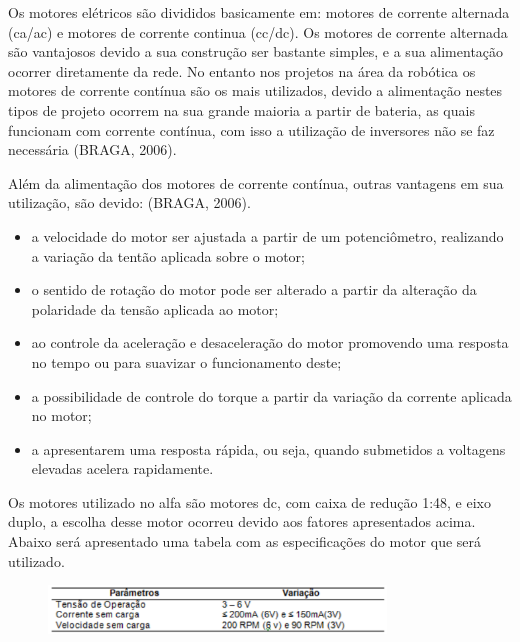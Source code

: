 Os motores elétricos são divididos basicamente em: motores de corrente alternada (ca/ac) e motores de corrente continua (cc/dc). Os motores de corrente alternada são vantajosos devido a sua construção ser bastante simples, e a sua alimentação ocorrer diretamente da rede. No entanto nos projetos na área da robótica os motores de corrente contínua são os mais utilizados, devido a alimentação nestes tipos de projeto ocorrem na sua grande maioria a partir de bateria, as quais funcionam com corrente contínua, com isso a utilização de inversores não se faz necessária (BRAGA, 2006).


Além da alimentação dos motores de corrente contínua, outras vantagens em sua utilização, são devido: (BRAGA, 2006).
\begin{itemize}
	\item a velocidade do motor ser ajustada a partir de um potenciômetro, realizando a variação da tentão aplicada sobre o motor;
	\item o sentido de rotação do motor pode ser alterado a partir da alteração da polaridade da tensão aplicada ao motor;
	\item ao controle da aceleração e desaceleração do motor promovendo uma resposta no tempo ou para suavizar o funcionamento deste;
	\item a possibilidade de controle do torque a partir da variação da corrente aplicada no motor;
	\item a apresentarem uma resposta rápida, ou seja, quando submetidos a voltagens elevadas acelera rapidamente.
\end{itemize}

Os motores utilizado no alfa são motores dc, com caixa de redução 1:48, e eixo duplo, a escolha desse motor ocorreu devido aos fatores apresentados acima. Abaixo será apresentado uma tabela com as especificações do motor que será utilizado.

\begin{figure}[H]
    \centering
    \includegraphics[width=0.8\textwidth]{figuras/tensao.eps}
    \caption{}
    \label{fig:catia01}
\end{figure}

